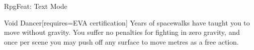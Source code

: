 \begin{ExampleBlock}{RpgFeat: Text Mode}
\begin{RpgFeat}{Void Dancer}[requires={EVA certification}]
    Years of spacewalks have taught you to move without gravity. You suffer no penalties for fighting in zero gravity, and once per scene you may push off any surface to move  metres as a free action.
\end{RpgFeat}


\end{ExampleBlock}
